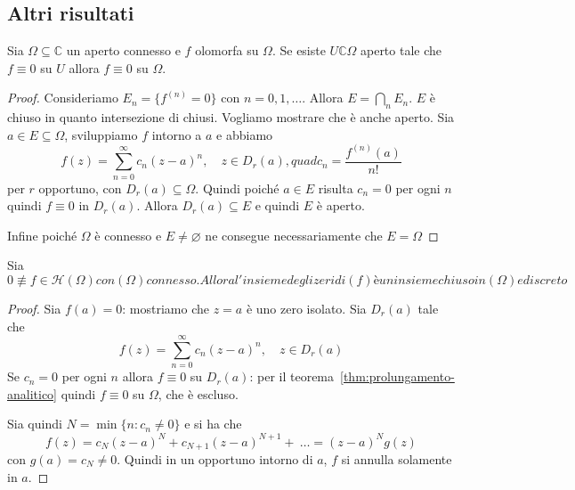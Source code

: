 \subsection{Altri risultati}

\begin{theorem}\label{thm:prolungamento-analitico}
    Sia \(\Omega \subseteq \mathbb{C} \) un aperto connesso e \(f\) olomorfa su
    \(\Omega\). Se esiste \(U \mathbb{C} \Omega\) aperto tale che \(f \equiv 0\)
    su \(U\) allora \(f \equiv 0\) su \(\Omega\).
\end{theorem}
\begin{proof}
    Consideriamo \(E_{n} = \{f^{{(n)}} = 0\} \) con \(n = 0, 1, \dots\). Allora
    \(E = \bigcap_{n} E_{n}\). \(E\) è chiuso in quanto intersezione di chiusi.
    Vogliamo mostrare che è anche aperto. Sia \(a \in E \subseteq \Omega \),
    sviluppiamo \(f\)  intorno a \(a\) e abbiamo
    \[
      f{(z)} = \sum_{n=0}^{\infty} c_{n} {(z-a)}^{n}, \quad z \in D_r{(a)}, quad
      c_{n} = \frac{f^{{(n)}}{(a)}}{n!}
    \]
    per \(r\) opportuno, con \(D_r{(a)} \subseteq \Omega \). Quindi poiché \(a
    \in E\) risulta \(c_{n}=0\) per ogni \(n\) quindi \(f \equiv 0\) in
    \(D_r{(a)}\). Allora \(D_r{(a)} \subseteq E\) e quindi \(E\) è aperto.

    Infine poiché \(\Omega\) è connesso e \(E \neq \varnothing\) ne consegue
    necessariamente che \(E = \Omega\) 
\end{proof}
\begin{corollary}\label{cor:zero-isolato}
    Sia \(0 \not\equiv f \in \mathcal{H}{(\Omega)} con {(\Omega)} connesso. Allora l'insieme
    degli zeri di {(f)} è un insieme chiuso in {(\Omega)} e discreto\) 
\end{corollary}
\begin{proof}
    Sia \(f{(a)} = 0\): mostriamo che \(z = a\) è uno zero isolato. Sia
    \(D_r{(a)}\) tale che
    \[
      f{(z)} = \sum_{n=0}^{\infty} c_{n} {(z-a)}^{n}, \quad z \in D_r{(a)} 
    \]
    Se \(c_{n} = 0\) per ogni \(n\) allora \(f\equiv 0\) su \(D_r{(a)}\): per il
    teorema~\ref{thm:prolungamento-analitico} quindi \(f \equiv 0\) su \(\Omega\), che è escluso.

    Sia quindi \(N = \min \{ n : c_{n} \neq 0\} \) e si ha che
    \[
        f{(z)} = c_N {(z-a)}^{N} + c_{N+1} {(z-a)}^{N+1} +~\dots = {(z-a)}^{N}
        g{(z)}
    \]
    con \(g{(a)} = c_N \neq 0\). Quindi in un opportuno intorno di \(a\), \(f\)
    si annulla solamente in \(a\).
\end{proof}
